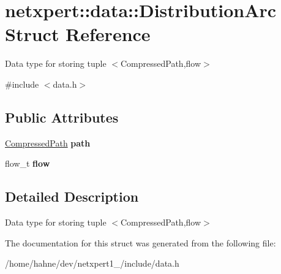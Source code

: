 \hypertarget{structnetxpert_1_1data_1_1DistributionArc}{}\section{netxpert\+:\+:data\+:\+:Distribution\+Arc Struct Reference}
\label{structnetxpert_1_1data_1_1DistributionArc}


Data type for storing tuple $<$Compressed\+Path,flow$>$  




{\ttfamily \#include $<$data.\+h$>$}

\subsection*{Public Attributes}
\begin{DoxyCompactItemize}
\item 
\hyperlink{namespacenetxpert_1_1data_a82e488b55f222a9759d73e24f6087033}{Compressed\+Path} {\bfseries path}\hypertarget{structnetxpert_1_1data_1_1DistributionArc_ac7b77e587a4e3345afc59618db3e5b77}{}\label{structnetxpert_1_1data_1_1DistributionArc_ac7b77e587a4e3345afc59618db3e5b77}

\item 
flow\+\_\+t {\bfseries flow}\hypertarget{structnetxpert_1_1data_1_1DistributionArc_a43332bf5cc4f8341dda9d6c7b1eaeafb}{}\label{structnetxpert_1_1data_1_1DistributionArc_a43332bf5cc4f8341dda9d6c7b1eaeafb}

\end{DoxyCompactItemize}


\subsection{Detailed Description}
Data type for storing tuple $<$Compressed\+Path,flow$>$ 

The documentation for this struct was generated from the following file\+:\begin{DoxyCompactItemize}
\item 
/home/hahne/dev/netxpert1\+\_/include/data.\+h\end{DoxyCompactItemize}
